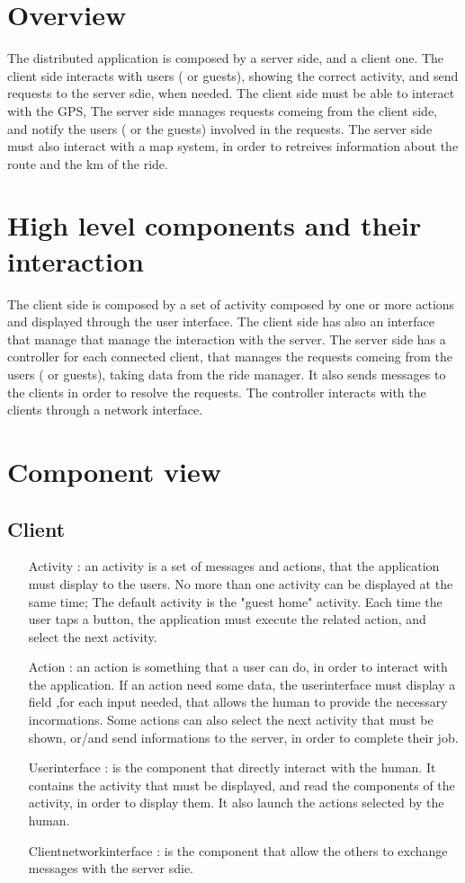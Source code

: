 \section{Overview}
The distributed application is composed by a server side, and a client one.
The client side interacts with users ( or guests), showing the correct activity, and send requests to the server sdie, when needed.
The client side must be able to interact with the GPS,
The server side manages requests comeing from the client side, and notify the users ( or the guests) involved in the requests.
The server side must also interact with a map system, in order to retreives information about the route and the km of the ride.
\section{High level components and their interaction}
The client side is composed by a set of activity composed by one or more actions and displayed through the user interface.
The client side has also an interface that manage that manage the interaction with the server.
The server side has a controller for each connected client, that manages the requests comeing from the users ( or guests), 
taking data from the ride manager. It also sends messages to the clients in order to resolve the requests.
The controller interacts with the clients through a network interface.
\section{Component view}
	\subsection{Client}
	 \begin{itemize}
	  \item [Activity]: an activity is a set of messages and actions, that the application must display to the users.
	  No more than one activity can be displayed at the same time;
	  The default activity is the "guest home" activity. Each time the user taps a button, the application must execute
	  the related action, and select the next activity. 
	  \item [Action]: an action is something that a user can do, in order to interact with the application.
	  If an action need some data, the userinterface must display a field ,for each input needed, that allows the human
	  to provide the necessary incormations.
	  Some actions can also select the next activity that must be shown, or/and send informations to the server,
	  in order to complete their job.
	  \item [Userinterface]: is the component that directly interact with the human.
	  It contains the activity that must be displayed, and read the components of the activity, in order to display them.
	  It also launch the actions selected by the human.
	  \item[Clientnetworkinterface]: is the component that allow the others to exchange messages with the server sdie.
	 \end{itemize}
